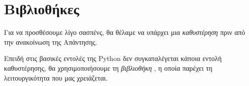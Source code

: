 \documentclass[a4paper,11pt,oneside]{book}
\begin{document}




\section{Βιβλιοθήκες}

Για να προσθέσουμε λίγο σασπένς, θα θέλαμε να υπάρχει μια \emph{καθυστέρηση} πριν από την ανακοίνωση της Απάντησης. 

Επειδή στις βασικές εντολές της Python δεν συγκαταλέγεται κάποια εντολή καθυστέρησης, θα χρησιμοποιήσουμε τη \emph{βιβλιοθήκη} , η οποία παρέχει τη λειτουργικότητα που μας χρειάζεται. 
\end{document}
